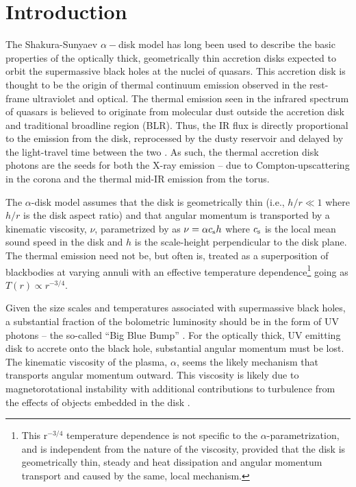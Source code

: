 \documentclass[a4paper,fleqn,usenatbib]{mnras}
\begin{document}
\section{Introduction}
The Shakura-Sunyaev $\alpha-$disk model \citep{SS73} has long been
used to describe the basic properties of the optically thick,
geometrically thin accretion disks expected to orbit the supermassive
black holes at the nuclei of quasars. This accretion disk is thought
to be the origin of thermal continuum emission observed in the
rest-frame ultraviolet and optical. The thermal emission seen in the
infrared spectrum of quasars is believed to originate from molecular
dust outside the accretion disk and traditional broadline region
(BLR). Thus, the IR flux is directly proportional to the emission from
the disk, reprocessed by the dusty reservoir and delayed by the
light-travel time between the two \citep[see e.g.,][for
reviews]{Antonucci1993, Perlman2008, Lasota2016}. As such, the thermal
accretion disk photons are the seeds for both the X-ray emission --
due to Compton-upscattering in the corona
\citep[e.g.,][]{Begelman1983, Risaliti2009, Lusso2017} and the thermal
mid-IR emission from the torus.

The $\alpha$-disk model assumes that the disk is geometrically thin
(i.e., $h/r \ll 1$ where $h/r$ is the disk aspect ratio) and that
angular momentum is transported by a kinematic viscosity, $\nu$,
parametrized by \citet{SS73} as $\nu = \alpha c_{\rm s} h$ where
$c_{\rm s}$ is the local mean sound speed in the disk and $h$ is the
scale-height perpendicular to the disk plane. The thermal emission
need not be, but often is, treated as a superposition of blackbodies
at varying annuli with an effective temperature
dependence\footnote{This r$^{-3/4}$ temperature dependence is not
specific to the $\alpha$-parametrization, and is independent from the
nature of the viscosity, provided that the disk is geometrically thin,
steady and heat dissipation and angular momentum transport and caused
by the same, local mechanism.} going as $T(r) \propto r^{-3/4}$.

Given the size scales and temperatures associated with supermassive
black holes, a substantial fraction of the bolometric luminosity
should be in the form of UV photons -- the so-called ``Big Blue Bump''
\citep{Shields1978, Malkan_Sargent1982}. For the optically thick, UV
emitting disk to accrete onto the black hole, substantial angular
momentum must be lost.  The kinematic viscosity of the plasma,
$\alpha$, seems the likely mechanism that transports angular momentum
outward.  This viscosity is likely due to magnetorotational
instability \citep[MRI; ][]{Balbus_Hawley1991} with additional
contributions to turbulence from the effects of objects embedded in
the disk \citep[e.g.,][]{McKernan2014}.
\end{document}
